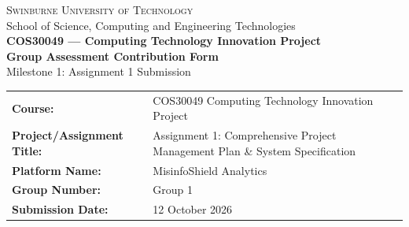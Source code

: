 \documentclass[11pt, a4paper]{article}
\begin{document}
\thispagestyle{empty}

\begin{tcolorbox}[
  enhanced,
  colback=brandNavy,
  colframe=brandNavy,
  arc=4pt,
  boxrule=0pt,
  left=14pt, right=14pt, top=14pt, bottom=14pt
]
  \centering
  {\color{white}\scshape\large Swinburne University of Technology}\\[2pt]
  {\color{white!80}\small School of Science, Computing and Engineering Technologies}\\[8pt]
  {\color{white}\bfseries\LARGE COS30049 --- Computing Technology Innovation Project}\\[6pt]
  {\color{white!95}\Large\textbf{Group Assessment Contribution Form}}\\[4pt]
  {\color{white!80}\small Milestone 1: Assignment 1 Submission}
\end{tcolorbox}

\vspace{0.5cm}

\begin{tcolorbox}[formbox, title=\textbf{Course and Project Information}]
  \begin{tabularx}{\linewidth}{@{}L{4.5cm} Y@{}}
    \textbf{Course:} & COS30049 Computing Technology Innovation Project \\
    \textbf{Project/Assignment Title:} & Assignment 1: Comprehensive Project Management Plan \& System Specification \\
    \textbf{Platform Name:} & MisinfoShield Analytics \\
    \textbf{Group Number:} & Group 1 \\
    \textbf{Submission Date:} & 12 October 2026 \\
  \end{tabularx}
\end{tcolorbox}

\vspace{0.3cm}
\end{document}
